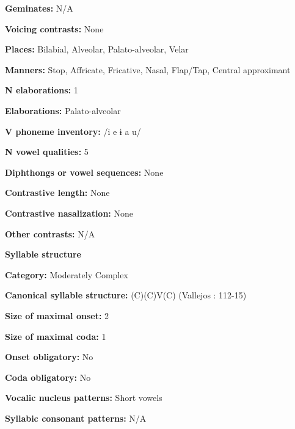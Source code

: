 \textbf{Geminates:} N/A



\textbf{Voicing contrasts:} None



\textbf{Places:} Bilabial, Alveolar, Palato-alveolar, Velar



\textbf{Manners:} Stop, Affricate, Fricative, Nasal, Flap/Tap, Central approximant



\textbf{N elaborations:} 1



\textbf{Elaborations:} Palato-alveolar



\textbf{V phoneme inventory:} /i e ɨ a u/



\textbf{N vowel qualities:} 5



\textbf{Diphthongs or vowel sequences:} None



\textbf{Contrastive length:} None



\textbf{Contrastive nasalization:} None



\textbf{Other contrasts:} N/A



\textbf{Syllable structure}



\textbf{Category:} Moderately Complex



\textbf{Canonical syllable structure:} (C)(C)V(C) (Vallejos \citealt{Yopán2010}: 112-15)



\textbf{Size of maximal onset:} 2



\textbf{Size of maximal coda:} 1



\textbf{Onset obligatory:} No



\textbf{Coda obligatory:} No



\textbf{Vocalic nucleus patterns:} Short vowels



\textbf{Syllabic consonant patterns:} N/A




